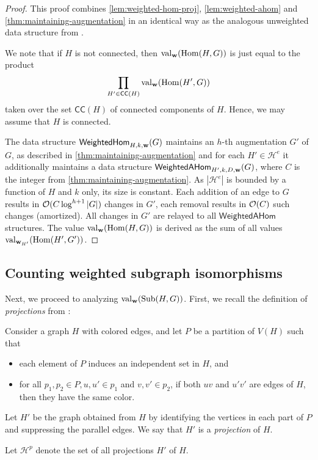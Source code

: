 \begin{proof}
	This proof combines \cref{lem:weighted-hom-proj}, \cref{lem:weighted-ahom} and \cref{thm:maintaining-augmentation} in an identical way as the analogous unweighted data structure from \cite{DvorakTumaArxiv}.
	
	We note that if $H$ is not connected, then $\mathrm{val}_{\mathbf{w}}(\mathrm{Hom}(H, G))$ is just equal to the product \[\prod_{H' \in \mathsf{CC}(H)} \mathrm{val}_{\mathbf{w}}(\mathrm{Hom}(H', G))\] taken over the set $\mathsf{CC}(H)$ of connected components of $H$. Hence, we may assume that $H$ is connected.
	
	The data structure $\mathsf{WeightedHom}_{H, k, \mathbf{w}}(G)$ maintains an $h$-th augmentation $G'$ of $G$, as described in \cref{thm:maintaining-augmentation} and for each $H' \in \mathcal{H}^e$ it additionally maintains a data structure $\mathsf{WeightedAHom}_{H', k, D, \mathbf{w}}(G)$, where $C$ is the integer from \cref{thm:maintaining-augmentation}. As $|\mathcal{H}^e|$ is bounded by a function of $H$ and $k$ only, its size is constant. Each addition of an edge to $G$ results in $\mathcal{O}(C \log^{h+1}|G|)$ changes in $G'$, each removal results in $\mathcal{O}(C)$ such changes (amortized).
	 All changes in $G'$ are relayed to all $\mathsf{WeightedAHom}$ structures. The value $\mathrm{val}_{\mathbf{w}}(\mathrm{Hom}(H, G))$ is derived as the sum of all values $\mathrm{val}_{\mathbf{w}_{H'}}(\mathrm{Hom}(H', G'))$.
\end{proof}

\subsection{Counting weighted subgraph isomorphisms}

Next, we proceed to analyzing $\mathrm{val}_{\mathbf{w}}(\mathrm{Sub}(H, G))$.  First, we  recall the definition of \textit{projections} from \cite{DvorakTumaArxiv}:
\begin{definition} \label{def:projections}
	Consider a graph $H$ with colored edges, and let $P$ be a partition of $V(H)$ such that
	\begin{itemize}
		\item each element of $P$ induces an independent set in $H$, and
		\item for all $p_1, p_2 \in P, u, u' \in p_1$ and $v, v' \in p_2$, if both $uv$ and $u'v'$ are edges of $H$, then they have the same color.
	\end{itemize}
	Let $H'$ be the graph obtained from $H$ by identifying the vertices in each part of $P$ and suppressing the parallel edges. We say that $H'$ is a \textit{projection} of $H$. 
\end{definition}
Let $\mathcal{H}^p$ denote the set of all projections $H'$ of $H$.


